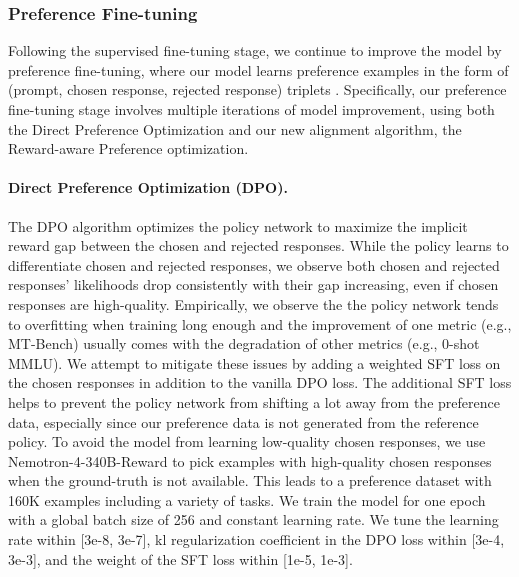 \documentclass[11pt]{article}
\newcommand{\oursrm}{Nemotron-4-340B-Reward}
\begin{document}
\subsubsection{Preference Fine-tuning}
Following the supervised fine-tuning stage, we continue to improve the model by preference fine-tuning, where our model learns preference examples in the form of (prompt, chosen response, rejected response) triplets \citep{ouyang2022training, bai2022training}. Specifically, our preference fine-tuning stage involves multiple iterations of model improvement, using both the Direct Preference Optimization \citep{rafailov2024direct} and our new alignment algorithm, the Reward-aware Preference optimization. 

\paragraph{Direct Preference Optimization (DPO).} The DPO \citep{rafailov2024direct} algorithm optimizes the policy network to maximize the implicit reward gap between the chosen and rejected responses. While the policy learns to differentiate chosen and rejected responses, we observe both chosen and rejected responses' likelihoods drop consistently with their gap increasing, even if chosen responses are high-quality. Empirically, we observe the the policy network tends to overfitting when training long enough and the improvement of one metric (e.g., MT-Bench) usually comes with the degradation of other metrics (e.g., 0-shot MMLU). We attempt to mitigate these issues by adding a weighted SFT loss on the chosen responses in addition to the vanilla DPO loss. The additional SFT loss helps to prevent the policy network from shifting a lot away from the preference data, especially since our preference data is not generated from the reference policy. To avoid the model from learning low-quality chosen responses, we use \oursrm{} to pick examples with high-quality chosen responses when the ground-truth is not available. This leads to a preference dataset with 160K examples including a variety of tasks. We train the model for one epoch with a global batch size of 256 and constant learning rate. We tune the learning rate within [3e-8, 3e-7], kl regularization coefficient in the DPO loss within [3e-4, 3e-3], and the weight of the SFT loss within [1e-5, 1e-3].
\end{document}
